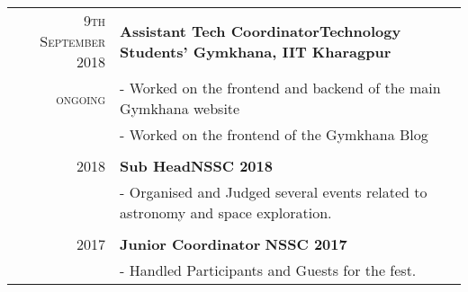 \documentclass[a4paper,12pt]{extarticle} %
\let\oldtextbf\textbf
\renewcommand{\textbf}[1]{\textcolor{bold}{\oldtextbf{#1}}}
\begin{document}
\begin{tabularx}{\linewidth}{ r | X }

\textsc{9th September 2018} & \textbf{Assistant Tech Coordinator}\hfill\textbf{Technology Students' Gymkhana, IIT Kharagpur}\\
\textsc{ongoing}& {- Worked on the frontend and backend of the main Gymkhana website}\\
& {- Worked on the frontend of the Gymkhana Blog}\\
\multicolumn{2}{c}{} \\

\textsc{2018} & \textbf{Sub Head}\hfill\textbf{NSSC 2018}\\
\textsc{}& {- Organised and Judged several events related to astronomy and space exploration.}\\
\multicolumn{2}{c}{} \\

\textsc{2017} & \textbf{Junior Coordinator} \hfill\textbf{NSSC 2017}\\
\textsc{} & {- Handled Participants and Guests for the fest.}\\
\end{tabularx}

\vspace{0.5cm}


\end{document}
